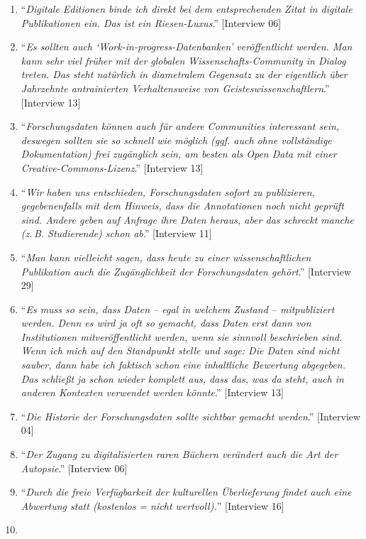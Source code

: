 \documentclass[a4paper,
fontsize=11pt,
oneside,
numbers=noperiodatend,
parskip=half-,
bibliography=totoc,
final
]{scrartcl}
\begin{document}
\begin{enumerate}
\item
  \enquote{\emph{Digitale Editionen binde ich direkt bei dem
  entsprechenden Zitat in digitale Publikationen ein. Das ist ein
  Riesen-Luxus}.} {[}Interview 06{]}
\item
  \enquote{\emph{Es sollten auch \enquote{Work-in-progress-Datenbanken}
  veröffentlicht werden. Man kann sehr viel früher mit der globalen
  Wissenschafts-Community in Dialog treten. Das steht natürlich in
  diametralem Gegensatz zu der eigentlich über Jahrzehnte antrainierten
  Verhaltensweise von Geisteswissenschaftlern}.} {[}Interview 13{]}
\item
  \enquote{\emph{Forschungsdaten können auch für andere Communities
  interessant sein, deswegen sollten sie so schnell wie möglich (ggf.
  auch ohne vollständige Dokumentation) frei zugänglich sein, am besten
  als Open Data mit einer Creative-Commons-Lizenz}.} {[}Interview 13{]}
\item
  \enquote{\emph{Wir haben uns entschieden, Forschungsdaten sofort zu
  publizieren, gegebenenfalls mit dem Hinweis, dass die Annotationen
  noch nicht geprüft sind. Andere geben auf Anfrage ihre Daten heraus,
  aber das schreckt manche (z.\,B. Studierende) schon ab}.} {[}Interview
  11{]}
\item
  \enquote{\emph{Man kann vielleicht sagen, dass heute zu einer
  wissenschaftlichen Publikation auch die Zugänglichkeit der
  Forschungsdaten gehört}.} {[}Interview 29{]}
\item
  \enquote{\emph{Es muss so sein, dass Daten -- egal in welchem Zustand
  -- mitpubliziert werden. Denn es wird ja oft so gemacht, dass Daten
  erst dann von Institutionen mitveröffentlicht werden, wenn sie
  sinnvoll beschrieben sind. Wenn ich mich auf den Standpunkt stelle und
  sage: Die Daten sind nicht sauber, dann habe ich faktisch schon eine
  inhaltliche Bewertung abgegeben. Das schließt ja schon wieder komplett
  aus, dass das, was da steht, auch in anderen Kontexten verwendet
  werden könnte}.} {[}Interview 13{]}
\item
  \enquote{\emph{Die Historie der Forschungsdaten sollte sichtbar
  gemacht werden}.} {[}Interview 04{]}
\item
  \enquote{\emph{Der Zugang zu digitalisierten raren Büchern verändert
  auch die Art der Autopsie}.} {[}Interview 06{]}
\item
  \enquote{\emph{Durch die freie Verfügbarkeit der kulturellen
  Überlieferung findet auch eine Abwertung statt (kostenlos = nicht
  wertvoll).}} {[}Interview 16{]}
\item

\end{enumerate}
\end{document}
